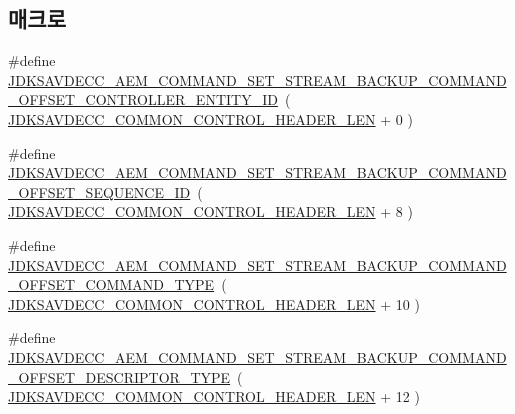 \subsection*{매크로}
\begin{DoxyCompactItemize}
\item 
\#define \hyperlink{group__command__set__stream__backup_ga72f02d7838f0453bc0893a0afdf43e1b}{J\+D\+K\+S\+A\+V\+D\+E\+C\+C\+\_\+\+A\+E\+M\+\_\+\+C\+O\+M\+M\+A\+N\+D\+\_\+\+S\+E\+T\+\_\+\+S\+T\+R\+E\+A\+M\+\_\+\+B\+A\+C\+K\+U\+P\+\_\+\+C\+O\+M\+M\+A\+N\+D\+\_\+\+O\+F\+F\+S\+E\+T\+\_\+\+C\+O\+N\+T\+R\+O\+L\+L\+E\+R\+\_\+\+E\+N\+T\+I\+T\+Y\+\_\+\+ID}~( \hyperlink{group__jdksavdecc__avtp__common__control__header_gaae84052886fb1bb42f3bc5f85b741dff}{J\+D\+K\+S\+A\+V\+D\+E\+C\+C\+\_\+\+C\+O\+M\+M\+O\+N\+\_\+\+C\+O\+N\+T\+R\+O\+L\+\_\+\+H\+E\+A\+D\+E\+R\+\_\+\+L\+EN} + 0 )
\item 
\#define \hyperlink{group__command__set__stream__backup_ga8e09b40e9b05550d2ef49e5bee46c6fb}{J\+D\+K\+S\+A\+V\+D\+E\+C\+C\+\_\+\+A\+E\+M\+\_\+\+C\+O\+M\+M\+A\+N\+D\+\_\+\+S\+E\+T\+\_\+\+S\+T\+R\+E\+A\+M\+\_\+\+B\+A\+C\+K\+U\+P\+\_\+\+C\+O\+M\+M\+A\+N\+D\+\_\+\+O\+F\+F\+S\+E\+T\+\_\+\+S\+E\+Q\+U\+E\+N\+C\+E\+\_\+\+ID}~( \hyperlink{group__jdksavdecc__avtp__common__control__header_gaae84052886fb1bb42f3bc5f85b741dff}{J\+D\+K\+S\+A\+V\+D\+E\+C\+C\+\_\+\+C\+O\+M\+M\+O\+N\+\_\+\+C\+O\+N\+T\+R\+O\+L\+\_\+\+H\+E\+A\+D\+E\+R\+\_\+\+L\+EN} + 8 )
\item 
\#define \hyperlink{group__command__set__stream__backup_gaa2a3fff9c7c0c33c7218baf9d7b867c2}{J\+D\+K\+S\+A\+V\+D\+E\+C\+C\+\_\+\+A\+E\+M\+\_\+\+C\+O\+M\+M\+A\+N\+D\+\_\+\+S\+E\+T\+\_\+\+S\+T\+R\+E\+A\+M\+\_\+\+B\+A\+C\+K\+U\+P\+\_\+\+C\+O\+M\+M\+A\+N\+D\+\_\+\+O\+F\+F\+S\+E\+T\+\_\+\+C\+O\+M\+M\+A\+N\+D\+\_\+\+T\+Y\+PE}~( \hyperlink{group__jdksavdecc__avtp__common__control__header_gaae84052886fb1bb42f3bc5f85b741dff}{J\+D\+K\+S\+A\+V\+D\+E\+C\+C\+\_\+\+C\+O\+M\+M\+O\+N\+\_\+\+C\+O\+N\+T\+R\+O\+L\+\_\+\+H\+E\+A\+D\+E\+R\+\_\+\+L\+EN} + 10 )
\item 
\#define \hyperlink{group__command__set__stream__backup_gab9a03c6251bd6562756f913c5636fdb9}{J\+D\+K\+S\+A\+V\+D\+E\+C\+C\+\_\+\+A\+E\+M\+\_\+\+C\+O\+M\+M\+A\+N\+D\+\_\+\+S\+E\+T\+\_\+\+S\+T\+R\+E\+A\+M\+\_\+\+B\+A\+C\+K\+U\+P\+\_\+\+C\+O\+M\+M\+A\+N\+D\+\_\+\+O\+F\+F\+S\+E\+T\+\_\+\+D\+E\+S\+C\+R\+I\+P\+T\+O\+R\+\_\+\+T\+Y\+PE}~( \hyperlink{group__jdksavdecc__avtp__common__control__header_gaae84052886fb1bb42f3bc5f85b741dff}{J\+D\+K\+S\+A\+V\+D\+E\+C\+C\+\_\+\+C\+O\+M\+M\+O\+N\+\_\+\+C\+O\+N\+T\+R\+O\+L\+\_\+\+H\+E\+A\+D\+E\+R\+\_\+\+L\+EN} + 12 )

\end{DoxyCompactItemize}
